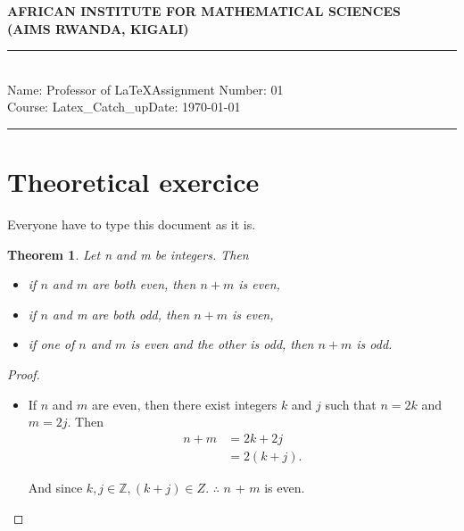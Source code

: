 \documentclass[12pt,a4paper]{article}
\newcommand{\student}{Professor of \LaTeX}
\newcommand{\course}{Latex\_Catch\_up}
\newcommand{\assignment}{01}
\newtheorem{thm}{Theorem}
\begin{document}
\thispagestyle{empty}
\begin{center}
\textbf{AFRICAN INSTITUTE FOR MATHEMATICAL SCIENCES \\[0.5cm]
(AIMS RWANDA, KIGALI)}
\vspace{1.0cm}
\end{center}

\noindent
\rule{17cm}{0.2cm}\\[0.3cm]
Name: \student \hfill Assignment Number: \assignment\\[0.1cm]
Course: \course \hfill Date: \today\\
\rule{17cm}{0.05cm}
\vspace{1.0cm}

\section{Theoretical exercice}

Everyone have to type this document as it is.

\begin{thm}
Let n and m be integers. Then
\begin{itemize}
	\item [i.] if $n$ and $m$ are both even, then $n + m$ is even,
	
	\item [ii.] if $n$ and m are both odd, then $n + m$ is even,
	
	\item [iii.] if one of $n$ and $m$ is even and the other is odd, then $n + m$ is odd.
\end{itemize}

\end{thm}

\begin{proof}
	
 \begin{itemize}
 	\item [i.]  If $n$ and $m$ are even, then there exist integers $k$ and $j$ such that $n = 2k$ and $m = 2j$. Then
 	\begin{align*}
 		n + m &= 2k + 2j\\
 		&= 2(k + j).
 	\end{align*}
 	
 	
 	And since $k, j \in \mathbb{Z} , (k + j) \in Z$. $\therefore$ $n$ + $m$ is even.
 	 
 \end{itemize}
 
\end{proof}
\end{document}
